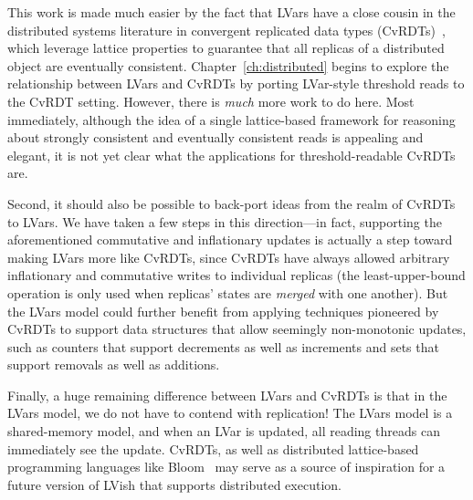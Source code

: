 This work is made much easier by the fact that LVars have a close
cousin in the distributed systems literature in convergent replicated
data types (CvRDTs)~\cite{crdts,crdts-tr}, which leverage lattice
properties to guarantee that all replicas of a distributed object are
eventually consistent.  Chapter~\ref{ch:distributed} begins to explore
the relationship between LVars and CvRDTs by porting LVar-style
threshold reads to the CvRDT setting.  However, there is \emph{much}
more work to do here.  Most immediately, although the idea of a single
lattice-based framework for reasoning about strongly consistent and
eventually consistent reads is appealing and elegant, it is not yet
clear what the applications for threshold-readable CvRDTs are.

Second, it should also be possible to back-port ideas from the realm
of CvRDTs to LVars.  We have taken a few steps in this direction---in
fact, supporting the aforementioned commutative and inflationary
updates is actually a step toward making LVars more like CvRDTs, since
CvRDTs have always allowed arbitrary inflationary and commutative
writes to individual replicas (the least-upper-bound operation is only
used when replicas' states are \emph{merged} with one another).  But
the LVars model could further benefit from applying techniques
pioneered by CvRDTs to support data structures that allow seemingly
non-monotonic updates, such as counters that support decrements as
well as increments and sets that support removals as well as
additions.

Finally, a huge remaining difference between LVars and CvRDTs is that
in the LVars model, we do not have to contend with replication!  The
LVars model is a shared-memory model, and when an LVar is updated, all
reading threads can immediately see the update.  CvRDTs, as well as
distributed lattice-based programming languages like
Bloom~\cite{bloom-cidr, blooml} may serve as a source of inspiration
for a future version of LVish that supports distributed execution.

